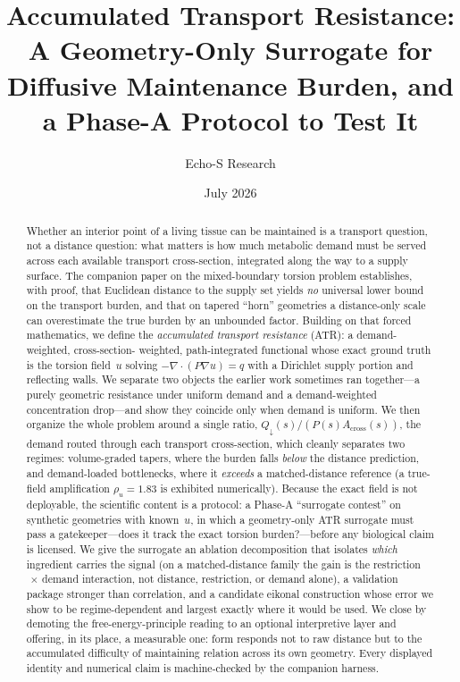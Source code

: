 \documentclass[11pt]{article}
\title{Accumulated Transport Resistance:\\
\large A Geometry-Only Surrogate for Diffusive Maintenance Burden,
and a Phase-A Protocol to Test It}
\author{Echo-S Research}
\date{July 2026}
\theoremstyle{remark}
\newcommand{\Acr}{A_{\mathrm{cross}}}
\newcommand{\Qdn}{Q_{\downarrow}}
\newcommand{\rhou}{\rho_u}
\begin{document}
\maketitle

\begin{abstract}
Whether an interior point of a living tissue can be maintained is a transport
question, not a distance question: what matters is how much metabolic demand must
be served across each available transport cross-section, integrated along the way
to a supply surface. The companion paper on the mixed-boundary torsion problem
establishes, with proof, that Euclidean distance to the supply set yields
\emph{no} universal lower bound on the transport burden, and that on tapered
``horn'' geometries a distance-only scale can overestimate the true burden by an
unbounded factor. Building on that forced mathematics, we define the
\emph{accumulated transport resistance} (ATR): a demand-weighted, cross-section-
weighted, path-integrated functional whose exact ground truth is the torsion
field~$u$ solving $-\nabla\!\cdot(P\nabla u)=q$ with a Dirichlet supply portion
and reflecting walls. We separate two objects the earlier work sometimes ran
together---a purely geometric resistance under uniform demand and a
demand-weighted concentration drop---and show they coincide only when demand is
uniform. We then organize the whole problem around a single ratio,
$\Qdn(s)/(P(s)\Acr(s))$, the demand routed through each transport cross-section,
which cleanly separates two regimes: volume-graded tapers, where the burden falls
\emph{below} the distance prediction, and demand-loaded bottlenecks, where it
\emph{exceeds} a matched-distance reference (a true-field amplification
$\rhou=1.83$ is exhibited numerically). Because the exact field is not deployable,
the scientific content is a protocol: a Phase-A ``surrogate contest'' on synthetic
geometries with known~$u$, in which a geometry-only ATR surrogate must pass a
gatekeeper---does it track the exact torsion burden?---before any biological
claim is licensed. We give the surrogate an ablation decomposition that isolates
\emph{which} ingredient carries the signal (on a matched-distance family the gain
is the restriction$\,\times\,$demand interaction, not distance, restriction, or
demand alone), a validation package stronger than correlation, and a candidate
eikonal construction whose error we show to be regime-dependent and largest
exactly where it would be used. We close by demoting the free-energy-principle
reading to an optional interpretive layer and offering, in its place, a
measurable one: form responds not to raw distance but to the accumulated
difficulty of maintaining relation across its own geometry. Every displayed
identity and numerical claim is machine-checked by the companion harness.
\end{abstract}
\end{document}
